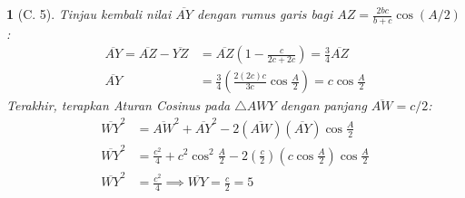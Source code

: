 \documentclass[11pt,a4paper,DIV=12]{scrartcl}
\theoremstyle{problemstyle}
\theoremstyle{answerstyle}
\newtheorem{answer}{}
\begin{document}
\begin{answer}[C. 5]
  Tinjau kembali nilai $\overline{AY}$ dengan rumus garis bagi $AZ = \frac{2bc}{b+c} \cos(A/2)$:
  \begin{align*}
    \overline{AY} = \overline{AZ} - \overline{YZ} & = \overline{AZ} \left( 1 - \frac{c}{2c+2c} \right) = \frac{3}{4} \overline{AZ}       \\
    \overline{AY}                                 & = \frac{3}{4} \left( \frac{2(2c)c}{3c} \cos \frac{A}{2} \right) = c \cos \frac{A}{2}
  \end{align*}
  Terakhir, terapkan Aturan Cosinus pada $\triangle AWY$ dengan panjang $\overline{AW} = c/2$:
  \begin{align*}
    \overline{WY}^2 & = \overline{AW}^2 + \overline{AY}^2 - 2 (\overline{AW}) (\overline{AY}) \cos \frac{A}{2}                          \\
    \overline{WY}^2 & = \frac{c^2}{4} + c^2\cos^2\frac{A}{2} - 2 \left(\frac{c}{2}\right) \left(c\cos\frac{A}{2}\right) \cos\frac{A}{2} \\
    \overline{WY}^2 & = \frac{c^2}{4} \implies \overline{WY} = \frac{c}{2} = \boxed{5}
  \end{align*}

\end{answer}
\end{document}
